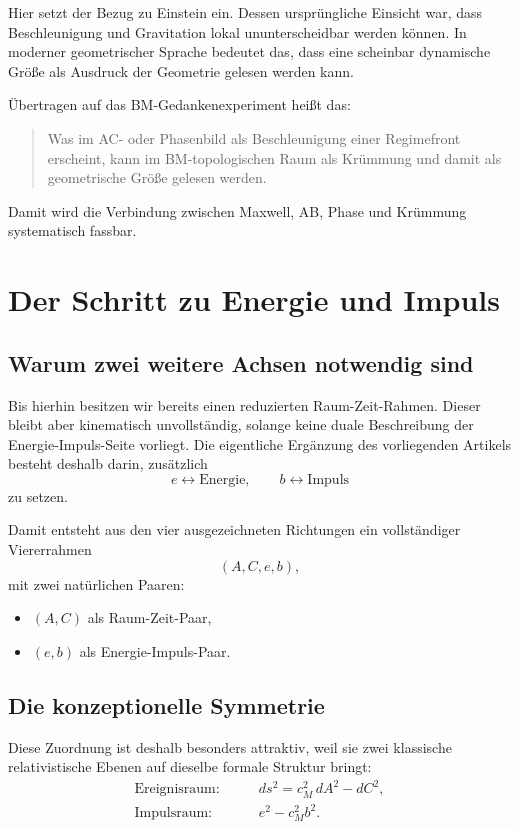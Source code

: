 \documentclass[11pt,a4paper]{article}
\theoremstyle{definition}
\theoremstyle{plain}
\begin{document}
	Hier setzt der Bezug zu Einstein ein. Dessen ursprüngliche Einsicht war, dass Beschleunigung und Gravitation lokal ununterscheidbar werden können. In moderner geometrischer Sprache bedeutet das, dass eine scheinbar dynamische Größe als Ausdruck der Geometrie gelesen werden kann.
	
	Übertragen auf das BM-Gedankenexperiment heißt das:
	\begin{quote}
		Was im AC- oder Phasenbild als Beschleunigung einer Regimefront erscheint, kann im BM-topologischen Raum als Krümmung und damit als geometrische Größe gelesen werden.
	\end{quote}
	
	Damit wird die Verbindung zwischen Maxwell, AB, Phase und Krümmung systematisch fassbar.
	
	\section{Der Schritt zu Energie und Impuls}
	
	\subsection{Warum zwei weitere Achsen notwendig sind}
	
	Bis hierhin besitzen wir bereits einen reduzierten Raum-Zeit-Rahmen. Dieser bleibt aber kinematisch unvollständig, solange keine duale Beschreibung der Energie-Impuls-Seite vorliegt. Die eigentliche Ergänzung des vorliegenden Artikels besteht deshalb darin, zusätzlich
	\[
	e \leftrightarrow \text{Energie},
	\qquad
	b \leftrightarrow \text{Impuls}
	\]
	zu setzen.
	
	Damit entsteht aus den vier ausgezeichneten Richtungen ein vollständiger Viererrahmen
	\[
	(A,C,e,b),
	\]
	mit zwei natürlichen Paaren:
	\begin{itemize}[leftmargin=2em]
		\item $(A,C)$ als Raum-Zeit-Paar,
		\item $(e,b)$ als Energie-Impuls-Paar.
	\end{itemize}
	
	\subsection{Die konzeptionelle Symmetrie}
	
	Diese Zuordnung ist deshalb besonders attraktiv, weil sie zwei klassische relativistische Ebenen auf dieselbe formale Struktur bringt:
	\begin{align*}
		\text{Ereignisraum:} & \qquad ds^2 = c_M^2\, dA^2 - dC^2,\\
		\text{Impulsraum:} & \qquad e^2 - c_M^2 b^2.
	\end{align*}
	
\end{document}
